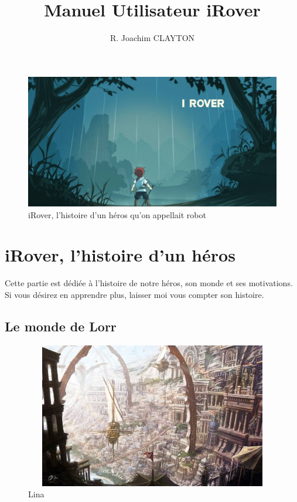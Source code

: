 \documentclass[a4paper 12pts]{article}
\title{Manuel Utilisateur iRover}
\author{R. Joachim CLAYTON}
\begin{document}
\maketitle


\begin{figure}[h]
   \includegraphics[width=350pt]{Illustration/proj_irover.jpg}
	\caption{iRover, l'histoire d'un héros qu'on appellait robot}
\end{figure}



\newpage


\renewcommand{\contentsname}{Sommaire} 
\tableofcontents

\newpage



\section{iRover, l'histoire d'un héros}


\vspace{1cm}

Cette partie est dédiée à l'histoire de notre héros, son monde et ses motivations.
Si vous désirez en apprendre plus, laisser moi vous compter son histoire.

\vspace{1cm}

\subsection{Le monde de Lorr}

\vspace{1cm}

\begin{figure}[h]
	\includegraphics[width=350pt, height=180pt]{Illustration/Lina.jpg}
	\caption{Lina}
\end{figure}
\end{document}
